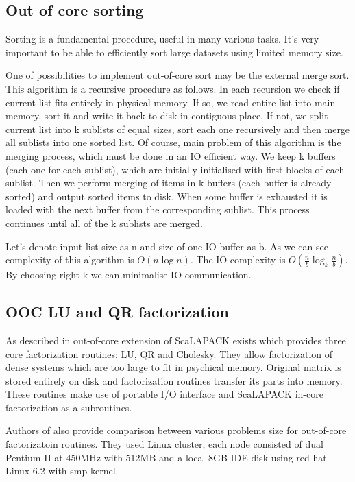 
\subsection{Out of core sorting}

Sorting is a fundamental procedure, useful in many various tasks.
It's very important to be able to efficiently sort large datasets using limited memory size.

One of possibilities to implement out-of-core sort may be the external merge sort.
This algorithm is a recursive procedure as follows.
In each recursion we check if current list fits entirely in physical memory.
If so, we read entire list into main memory, sort it and write it back to disk in contiguous place.
If not, we split current list into k sublists of equal sizes, sort each one recursively and then merge all sublists into one sorted list.
Of course, main problem of this algorithm is the merging process, which must be done in an IO efficient way.
We keep k buffers (each one for each sublist), which are initially initialised with first blocks of each sublist.
Then we perform merging of items in k buffers (each buffer is already sorted) and output sorted items to disk.
When some buffer is exhausted it is loaded with the next buffer from the corresponding sublist.
This process continues until all of the k sublists are merged.

Let's denote input list size as n and size of one IO buffer as b.
As we can see complexity of this algorithm is $O(n\log{n})$.
The IO complexity is $\displaystyle O(\frac{n}{b}\log_{k}\frac{n}{b})$.
By choosing right k we can minimalise IO communication.


\subsection{OOC LU and QR factorization}


As described in \cite{ooc-scalapack} out-of-core extension of ScaLAPACK exists which provides three core factorization routines: LU, QR and Cholesky.
They allow factorization of dense systems which are too large to fit in psychical memory. 
Original matrix is stored entirely on disk and factorization routines transfer its parts into memory. 
These routines make use of portable I/O interface and ScaLAPACK in-core factorization as a subroutines.

Authors of \cite{ooc-scalapack} also provide comparison between various problems size for out-of-core factorizatoin routines. 
They used Linux cluster, each node consisted of dual Pentium II at 450MHz with 512MB and a local 8GB IDE disk using red-hat Linux 6.2 with smp kernel.

